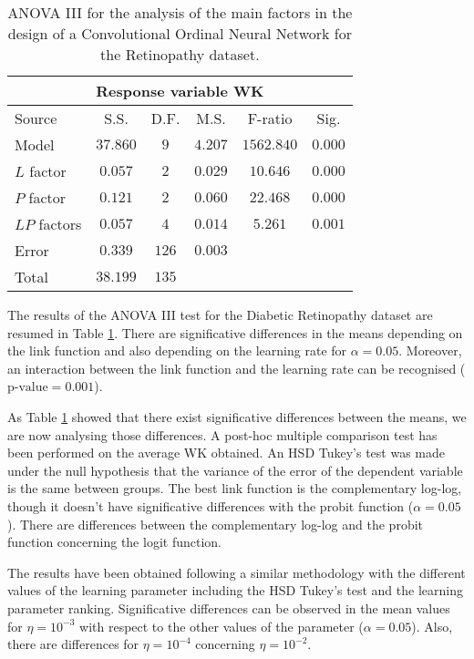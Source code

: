 \documentclass[journal]{IEEEtran}
\begin{document}
	\begin{table}[!t]
		\caption{ANOVA III for the analysis of the main factors in the design of a Convolutional Ordinal Neural Network for the Retinopathy dataset.}
		\label{table:ANOVARetinopathy}
		\centering
		\small
		\begin{tabular}{l|ccccc}
			\multicolumn{6}{c}{Response variable WK}\\\hline
			Source & S.S. & D.F. & M.S. & F-ratio & Sig.\\\hline
			Model & $37.860$ & $9$ & $4.207$ & $1562.840$ & $0.000$\\
			$L$ factor & $0.057$ & $2$ & $0.029$ & $10.646$ & $0.000$\\
			$P$ factor & $0.121$ & $2$ & $0.060$ & $22.468$ & $0.000$\\
			$LP$ factors & $0.057$ & $4$ & $0.014$ & $5.261$ & $0.001$\\
			Error & $0.339$ & $126$ & $0.003$ & & \\
			Total & $38.199$ & $135$ & & & 
		\end{tabular}
	\end{table}
	
	The results of the ANOVA III test for the Diabetic Retinopathy dataset are resumed in Table \ref{table:ANOVARetinopathy}. There are significative differences in the means depending on the link function and also depending on the learning rate for $\alpha=0.05$. Moreover, an interaction between the link function and the learning rate can be recognised ($\text{p-value} = 0.001$).
	
	As Table \ref{table:ANOVARetinopathy} showed that there exist significative differences between the means, we are now analysing those differences. A post-hoc multiple comparison test has been performed on the average WK obtained. An HSD Tukey's test was made under the null hypothesis that the variance of the error of the dependent variable is the same between groups. The best link function is the complementary log-log, though it doesn't have significative differences with the probit function ($\alpha=0.05$). There are differences between the complementary log-log and the probit function concerning the logit function.
	
	The results have been obtained following a similar methodology with the different values of the learning parameter including the HSD Tukey's test and the learning parameter ranking. Significative differences can be observed in the mean values for $\eta = 10^{-3}$ with respect to the other values of the parameter ($\alpha=0.05$). Also, there are differences for $\eta = 10^{-4}$ concerning $\eta = 10^{-2}$.
	
\end{document}

